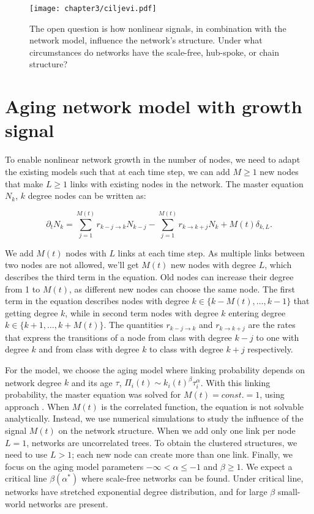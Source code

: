 
\begin{figure}[!ht]
	\centering
	\texttt{[image: chapter3/ciljevi.pdf]}
	\caption[Nonlinear growth of the network.]{The open question is how nonlinear signals, in combination with the network model, influence the network's structure. Under what circumstances do networks have the scale-free, hub-spoke, or chain structure? }
	\label{fig:ciljevi}
\end{figure}

\section{Aging network model with growth signal}

To enable nonlinear network growth in the number of nodes, we need to adapt the existing models such that at each time step, we can add $M\geq1$ new nodes that make $L\geq1$ links with existing nodes in the network. The master equation $N_k$, $k$ degree nodes can be written as: 

\begin{equation}
\partial_{t}N_{k}=\sum^{M(t)}_{j=1}r_{k-j\longrightarrow k}N_{k-j}-\sum^{M(t)}_{j=1}r_{k\longrightarrow k+j}N_{k}+M(t)\delta_{k,L} . \label{eq:aging_master}  
\end{equation}

We add $M(t)$ nodes with $L$ links at each time step. As multiple links between two nodes are not allowed, we'll get $M(t)$ new nodes with degree $L$, which describes the third term in the equation. Old nodes can increase their degree from 1 to $M(t)$, as different new nodes can choose the same node. The first term in the equation describes nodes with degree $k\in\{k-M(t),\ldots, k-1\}$ that getting degree $k$, while in second term nodes with degree $k$ entering degree  $k\in\{k+1,\ldots, k+M(t)\}$. The quantities $r_{k-j\longrightarrow k}$ and $r_{k\longrightarrow k+j}$ are the rates that express the transitions of a node from class with degree $k-j$ to one with degree $k$ and from class with degree $k$ to class with degree $k+j$ respectively.  

For the model, we choose the aging model where linking probability depends on network degree $k$ and its age $\tau$, $\Pi_{i}(t)\sim k_{i}(t)^{\beta}\tau_{i}^{\alpha}$. With this linking probability, the master equation was solved for $M(t)=const.=1$, using approach \cite{dorogovtsev2001b}. When $M(t)$ is the correlated function, the equation is not solvable analytically. Instead, we use numerical simulations to study the influence of the signal $M(t)$ on the network structure. When we add only one link per node $L=1$, networks are uncorrelated trees. To obtain the clustered structures, we need to use $L>1$; each new node can create more than one link. Finally, we focus on the aging model parameters $-\infty<\alpha\leq-1$ and $\beta\geq1$. We expect a critical line $\beta(\alpha^{*})$ where scale-free networks can be found. Under critical line, networks have stretched exponential degree distribution, and for large $\beta$ small-world networks are present. 

